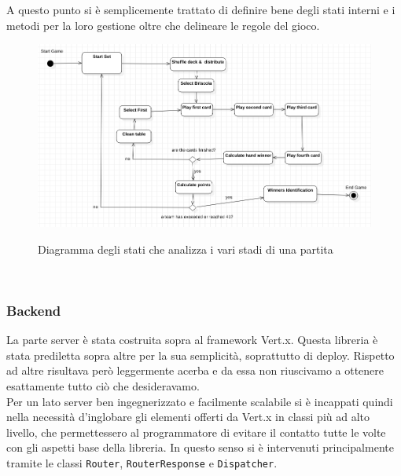 	  A questo punto si è semplicemente trattato di definire bene degli stati interni e i metodi per la loro gestione oltre che delineare le regole del gioco.
            \begin{figure}[!h]
                \includegraphics[scale=0.5]{images/MatchStateChar.png}
                \label{fig:MatchStateChar}
                \caption{Diagramma degli stati che analizza i vari stadi di una partita}
            \end{figure}
	  \\
	  \subsubsection{Backend}
	  La parte server è stata costruita sopra al framework Vert.x. Questa libreria è stata prediletta sopra altre per la sua semplicità, soprattutto di deploy. Rispetto ad altre risultava però leggermente acerba e da essa non riuscivamo a ottenere esattamente tutto ciò che desideravamo. 
	  \\
	  Per un lato server ben ingegnerizzato e facilmente scalabile si è incappati quindi nella necessità d'inglobare gli elementi offerti da Vert.x in classi più ad alto livello, che permettessero al programmatore di evitare il contatto tutte le volte con gli aspetti base della libreria. 
	  In questo senso si è intervenuti principalmente tramite le classi \texttt{Router}, \texttt{RouterResponse} e \texttt{Dispatcher}.
	  
